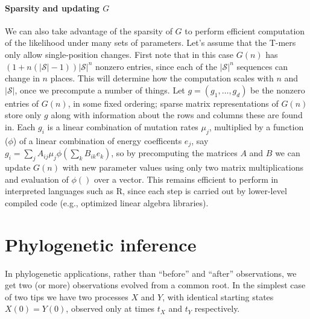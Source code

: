 \documentclass{article}
\newcommand{\calS}{\mathcal{S}}  %
\theoremstyle{plain}
\theoremstyle{definition}
\begin{document}
\paragraph{Sparsity and updating $G$}
We can also take advantage of the sparsity of $G$ to perform efficient computation of the likelihood
under many sets of parameters.
Let's assume that the T-mers only allow single-position changes.
First note that in this case $G(n)$ has
$(1+n(|\calS|-1)) |\calS|^{n}$ nonzero entries,
since each of the $|\calS|^{n}$ sequences can change in $n$ places.
This will determine how the computation scales with $n$ and $|\calS|$,
once we precompute a number of things.
Let $g = (g_1, \ldots, g_d)$ be the nonzero entries of $G(n)$, in some fixed ordering;
sparse matrix representations of $G(n)$ store only $g$ along with information about the rows and columns these are found in.
Each $g_i$ is a linear combination of mutation rates $\mu_j$,
multiplied by a function ($\phi$) of a linear combination of energy coefficents $e_j$,
say $g_i = \sum_j A_{ij} \mu_j \phi(\sum_k B_{ik} e_k)$,
so by precomputing the matrices $A$ and $B$ we can update $G(n)$ with new parameter values
using only two matrix multiplications and evaluation of $\phi()$ over a vector.
This remains efficient to perform in interpreted languages such as R,
since each step is carried out by lower-level compiled code (e.g., optimized linear algebra libraries).

\section{Phylogenetic inference}

In phylogenetic applications, rather than ``before'' and ``after'' observations,
we get two (or more) observations evolved from a common root.
In the simplest case of two tips we have two processes $X$ and $Y$,
with identical starting states $X(0)=Y(0)$,
observed only at times $t_X$ and $t_Y$ respectively.
\end{document}
